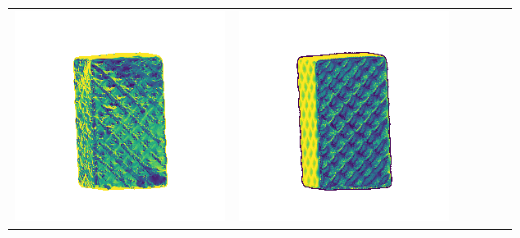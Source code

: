 \begin{center}
\begin{tabularx}{\linewidth}{@{}Y@{}Y@{}Y@{}Y@{}Y@{}Y@{}}
\includegraphics[width=\linewidth]{semisynthetic/20160617_18_yu_err.png} &
\includegraphics[width=\linewidth]{semisynthetic/20160617_18_dpsn_err.png} &

\end{tabularx}
\end{center}
